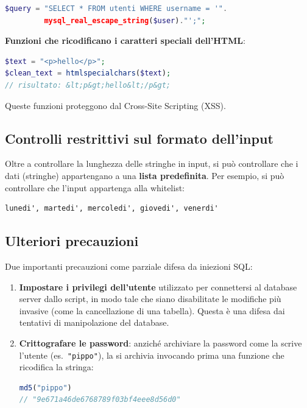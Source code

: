 \begin{lstlisting}[language=PHP]
$query = "SELECT * FROM utenti WHERE username = '".
         mysql_real_escape_string($user)."';";
\end{lstlisting}

\textbf{Funzioni che ricodificano i caratteri speciali dell'HTML}:

\begin{lstlisting}[language=PHP]
$text = "<p>hello</p>";
$clean_text = htmlspecialchars($text);
// risultato: &lt;p&gt;hello&lt;/p&gt;
\end{lstlisting}

Queste funzioni proteggono dal Cross-Site Scripting (XSS).

\subsection{Controlli restrittivi sul formato dell'input}

Oltre a controllare la lunghezza delle stringhe in input, si può controllare che i dati (stringhe) appartengano a una \textbf{lista predefinita}. Per esempio, si può controllare che l'input appartenga alla whitelist:

\begin{verbatim}
lunedi', martedi', mercoledi', giovedi', venerdi'
\end{verbatim}

\subsection{Ulteriori precauzioni}

Due importanti precauzioni come parziale difesa da iniezioni SQL:

\begin{enumerate}
    \item \textbf{Impostare i privilegi dell'utente} utilizzato per connettersi al database server dallo script, in modo tale che siano disabilitate le modifiche più invasive (come la cancellazione di una tabella). Questa è una difesa dai tentativi di manipolazione del database.
    \item \textbf{Crittografare le password}: anziché archiviare la password come la scrive l'utente (es.\ \texttt{"pippo"}), la si archivia invocando prima una funzione che ricodifica la stringa:
    \begin{lstlisting}[language=PHP]
md5("pippo")
// "9e671a46de6768789f03bf4eee8d56d0"
    \end{lstlisting}
\end{enumerate}

